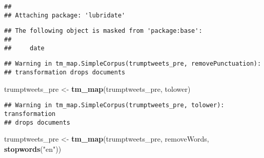 \documentclass[]{article}
\newenvironment{Shaded}{\begin{snugshade}}{\end{snugshade}}
\newcommand{\KeywordTok}[1]{\textcolor[rgb]{0.13,0.29,0.53}{\textbf{#1}}}
\newcommand{\DataTypeTok}[1]{\textcolor[rgb]{0.13,0.29,0.53}{#1}}
\newcommand{\StringTok}[1]{\textcolor[rgb]{0.31,0.60,0.02}{#1}}
\newcommand{\OperatorTok}[1]{\textcolor[rgb]{0.81,0.36,0.00}{\textbf{#1}}}
\newcommand{\NormalTok}[1]{#1}
\begin{document}
\begin{verbatim}
## 
## Attaching package: 'lubridate'
\end{verbatim}

\begin{verbatim}
## The following object is masked from 'package:base':
## 
##     date
\end{verbatim}

\begin{Shaded}
\end{Shaded}

\begin{verbatim}
## Warning in tm_map.SimpleCorpus(trumptweets_pre, removePunctuation):
## transformation drops documents
\end{verbatim}

\begin{Shaded}
\begin{Highlighting}[]
\NormalTok{trumptweets_pre <-}\StringTok{ }\KeywordTok{tm_map}\NormalTok{(trumptweets_pre, tolower)}
\end{Highlighting}
\end{Shaded}

\begin{verbatim}
## Warning in tm_map.SimpleCorpus(trumptweets_pre, tolower): transformation
## drops documents
\end{verbatim}

\begin{Shaded}
\begin{Highlighting}[]
\NormalTok{trumptweets_pre <-}\StringTok{ }\KeywordTok{tm_map}\NormalTok{(trumptweets_pre, removeWords, }\KeywordTok{stopwords}\NormalTok{(}\StringTok{"en"}\NormalTok{))}
\end{Highlighting}
\end{Shaded}
\end{document}

